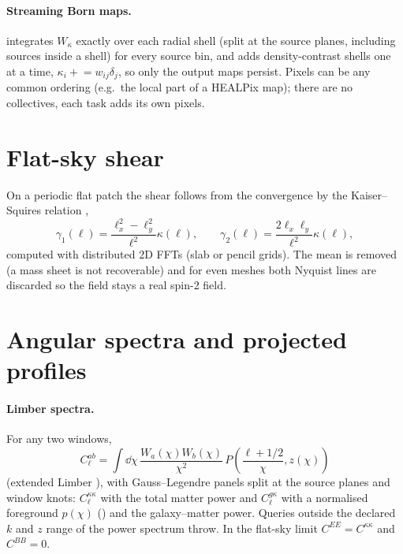 \paragraph*{Streaming Born maps.}  integrates $W_\kappa$ exactly over each radial shell (split at the source planes, including sources inside a
shell) for every source bin, and  adds density-contrast shells one at a time, $\kappa_i\mathrel{+}=w_{ij}\delta_j$, so only the output maps
persist. Pixels can be any common ordering (e.g.\ the local part of a HEALPix map); there are no collectives, each task adds its own pixels.

\section{Flat-sky shear}\label{sec:wl-shear}

On a periodic flat patch the shear follows from the convergence by the Kaiser--Squires relation \cite{KaiserSquires1993},
\begin{equation}
\gamma_1(\bm\ell)=\frac{\ell_x^2-\ell_y^2}{\ell^2}\kappa(\bm\ell),\qquad\gamma_2(\bm\ell)=\frac{2\ell_x\ell_y}{\ell^2}\kappa(\bm\ell),
\end{equation}
computed with distributed 2D FFTs (slab or pencil grids). The mean is removed (a mass sheet is not recoverable) and for even meshes both Nyquist lines are
discarded so the field stays a real spin-2 field.

\section{Angular spectra and projected profiles}\label{sec:wl-spectra}

\paragraph*{Limber spectra.} For any two windows,
\begin{equation}
C_\ell^{ab}=\int\dd\chi\,\frac{W_a(\chi)W_b(\chi)}{\chi^2}\,P\!\left(\frac{\ell+1/2}{\chi},z(\chi)\right)
\end{equation}
(extended Limber \cite{Limber1953,LoVerde2008}), with Gauss--Legendre panels split at the source planes and window knots: $C_\ell^{\kappa\kappa}$ with the total
matter power and $C_\ell^{g\kappa}$ with a normalised foreground $p(\chi)$ () and the galaxy--matter power. Queries outside the declared $k$
and $z$ range of the power spectrum throw. In the flat-sky limit $C^{EE}=C^{\kappa\kappa}$ and $C^{BB}=0$.

